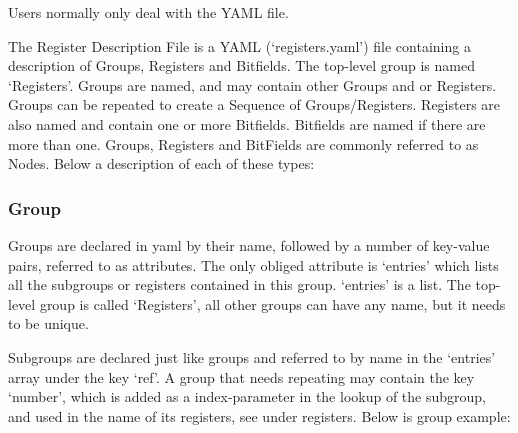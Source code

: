 \documentclass[letterpaper,10pt,english]{sphinxmanual}
\begin{document}
Users normally only deal with the YAML file.

The Register Description File is a YAML (`registers.yaml') file containing a
description of Groups, Registers and Bitfields. The top-level group is named
`Registers'. Groups are named, and
may contain other Groups and or Registers. Groups can be repeated to create
a Sequence of Groups/Registers. Registers are also named and contain one or more
Bitfields. Bitfields are named if there are more than one.
Groups, Registers and BitFields are commonly referred to as Nodes. Below a
description of each of these types:


\subsubsection{Group}
\label{\detokenize{user:group}}
Groups are declared in yaml by their name, followed by a number of key-value
pairs, referred to as attributes. The only obliged attribute is `entries' which
lists all the subgroups or registers contained in this group. `entries' is a
list. The top-level group is called `Registers', all other groups can have
any name, but it needs to be unique.

Subgroups are declared just like groups
and referred to by name in the `entries' array under the key `ref'. A group that
needs repeating may contain the key `number', which is added as a index-parameter
in the lookup of the subgroup, and used in the name of its registers, see under registers.
Below is group example:

\begin{sphinxVerbatim}[commandchars=\\\{\}]
   
   
   
      
       
      
       
      
       

\end{sphinxVerbatim}
\end{document}
